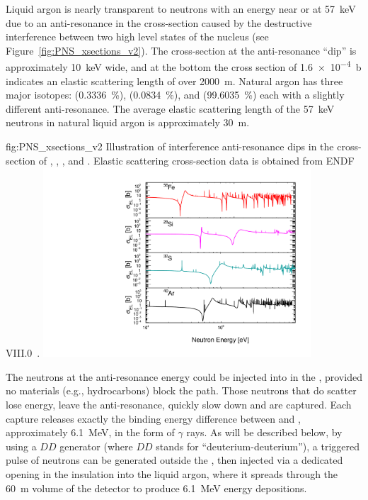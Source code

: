 Liquid argon is nearly transparent to neutrons with an energy near or at \SI{57}{\keV} due to an anti-resonance in the cross-section caused by the destructive interference between two high level states of the  nucleus (see Figure~\ref{fig:PNS_xsections_v2}). The cross-section at the anti-resonance ``dip'' is approximately \SI{10}{\keV} wide, and at the bottom the cross section of \SI{1.6e-4}{\barn} indicates an elastic scattering length of over \SI{2000}{\m}. %
Natural argon has three major isotopes:  (\SI{0.3336}{\%}),  (\SI{0.0834}{\%}), and  (\SI{99.6035}{\%}) each with a slightly different anti-resonance. The average elastic scattering length of the \SI{57}{\keV} neutrons in natural liquid argon is approximately \SI{30}{\m}.%

\begin{dunefigure}{fig:PNS_xsections_v2}
{Illustration of interference anti-resonance dips in the cross-section of , , , and . Elastic scattering cross-section data is obtained from ENDF VIII.0~\cite{BROWN20181}.}
\includegraphics[width=10cm]{graphics/PNS_xsection.pdf}
\end{dunefigure}

The neutrons at the anti-resonance energy could be injected into  in the , provided no materials (e.g., hydrocarbons) block the path. Those neutrons that do scatter lose energy, leave the anti-resonance, quickly slow down and are captured. Each capture releases exactly the binding energy difference between  and , approximately \SI{6.1}{\MeV}, in the form of $\gamma$ rays. As will be described below, by using a $DD$ generator (where $DD$ stands for ``deuterium-deuterium''), a triggered pulse of neutrons can be generated outside the , then injected via a dedicated opening in the insulation into the liquid argon, where it spreads through the \SI{60}{\m} volume of the detector to produce \SI{6.1}{\MeV} energy depositions. %

